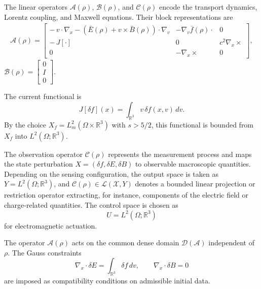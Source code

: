 \documentclass[AMA,Times2COL]{WileyNJDv5}
\begin{document}
The linear operators $\mathcal{A}(\rho)$, $\mathcal{B}(\rho)$, and $\mathcal{C}(\rho)$ encode the transport dynamics, Lorentz coupling, and Maxwell equations.
Their block representations are
\begin{align*}
\mathcal{A}(\rho)=
\begin{bmatrix}
-\,v\!\cdot\nabla_x
-(\bar E(\rho)+v\times\bar B(\rho))\!\cdot\nabla_v
&
-\nabla_v \bar f(\rho)\!\cdot
&
0\\[0.4em]
-\,J[\cdot]
&
0
&
c^2\nabla_x\times\\[0.4em]
0
&
-\nabla_x\times
&
0
\end{bmatrix},
\end{align*}
\(\mathcal{B}(\rho)=
\begin{bmatrix}
0\\[0.2em]
I\\[0.2em]
0
\end{bmatrix}.\)

The current functional is
\[
J[\delta f](x)=\int_{\mathbb{R}^3} v\,\delta f(x,v)\,dv.
\]
By the choice $X_f=L^2_m(\Omega\times\mathbb R^3)$ with $s>5/2$, this functional is bounded from $X_f$ into $L^2(\Omega;\mathbb R^3)$.

\smallskip
The observation operator $\mathcal{C}(\rho)$ represents the measurement process and maps the state perturbation
$X=(\delta f,\delta E,\delta B)$ to observable macroscopic quantities.
Depending on the sensing configuration, the output space is taken as $Y=L^2(\Omega;\mathbb{R}^3)$, and
$\mathcal{C}(\rho)\in\mathcal{L}(\mathscr{X},Y)$ denotes a bounded linear projection or restriction operator extracting, for instance, components of the electric field or charge-related quantities.
The control space is chosen as
\[
U=L^2(\Omega;\mathbb{R}^3)
\]
for electromagnetic actuation.

\smallskip
The operator $\mathcal{A}(\rho)$ acts on the common dense domain $\mathcal{D}(\mathcal{A})$
independent of $\rho$.
The Gauss constraints
\[
\nabla_x\!\cdot\delta E=\int_{\mathbb{R}^3}\delta f\,dv,
\qquad
\nabla_x\!\cdot\delta B=0
\]
are imposed as compatibility conditions on admissible initial data.
\end{document}
